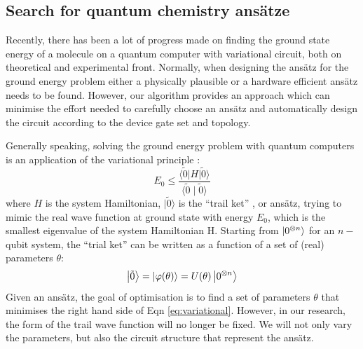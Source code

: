 \documentclass[a4paper,onecolumn,11pt]{quantumarticle}
\begin{document}


\subsection{Search for quantum chemistry ans\"atze}\label{h2}


Recently, there has been a lot of progress made on finding the ground state energy of a molecule on a quantum computer with variational circuit, both on theoretical \cite{li2017efficient,mcclean2016theory,wecker2015progress} and experimental \cite{peruzzo2014variational,o2016scalable, colless2017implementing, kandala2017hardware, colless2018computation, dumitrescu2018cloud} front. 
Normally, when designing the ans\"atz for the ground energy problem either a physically plausible or a hardware efficient ans\"atz needs to be found. However, our algorithm provides an approach which can minimise the effort needed to carefully choose an ans\"atz and automatically design the circuit according to the device gate set and topology.

Generally speaking, solving the ground energy problem with quantum computers is an application of the variational principle \cite{sakurai_napolitano_2017}:
\begin{equation}
E_0 \leq \frac{\langle\tilde{0}|H| \tilde{0}\rangle}{\langle\tilde{0} \mid \tilde{0}\rangle} \label{eq:variational}
\end{equation}
where $H$ is the system Hamiltonian, $| \tilde{0}\rangle$ is the ``trail ket'' \cite{sakurai_napolitano_2017}, or ans\"atz, trying to mimic the real wave function at ground state with energy $E_0$, which is the smallest eigenvalue of the system Hamiltonian H. Starting from $\ket{0^{\otimes n}}$ for an $n-$qubit system, the ``trial ket'' can be written as a function of a set of (real) parameters $\theta$:
\begin{equation}
    \ket{\tilde{0}} = \ket{\varphi (\theta)} = U(\theta)\ket{0^{\otimes n}}
\end{equation}
Given an ans\"atz, the goal of optimisation is to find a set of parameters $\theta$ that minimises the right hand side of Eqn \ref{eq:variational}. However, in our research, the form of the trail wave function will no longer be fixed. We will not only vary the parameters, but also the circuit structure that represent the ans\"atz.
\end{document}

